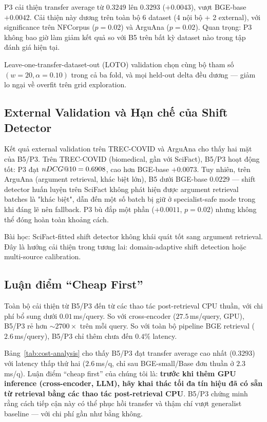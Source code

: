 P3 cải thiện transfer average từ $0.3249$ lên $0.3293$ ($+0.0043$), vượt BGE-base $+0.0042$. Cải thiện
này dương trên toàn bộ 6 dataset (4 nội bộ + 2 external), với significance trên NFCorpus ($p=0.02$) và
ArguAna ($p=0.02$). Quan trọng: P3 không bao giờ làm giảm kết quả so với B5 trên bất kỳ dataset nào
trong tập đánh giá hiện tại.

Leave-one-transfer-dataset-out (LOTO) validation chọn cùng bộ tham số $(w=20, \alpha=0.10)$ trong cả ba
fold, và mọi held-out delta đều dương --- giảm lo ngại về overfit trên grid exploration.

\subsection{External Validation và Hạn chế của Shift Detector}

Kết quả external validation trên TREC-COVID và ArguAna cho thấy hai mặt của B5/P3. Trên TREC-COVID
(biomedical, gần với SciFact), B5/P3 hoạt động tốt: P3 đạt $nDCG@10 = 0.6908$, cao hơn BGE-base $+0.0073$.
Tuy nhiên, trên ArguAna (argument retrieval, khác biệt lớn), B5 dưới BGE-base $0.0229$ --- shift
detector huấn luyện trên SciFact không phát hiện được argument retrieval batches là "khác biệt", dẫn đến
một số batch bị giữ ở specialist-safe mode trong khi đáng lẽ nên fallback. P3 bù đắp một phần ($+0.0011$,
$p=0.02$) nhưng không thể đóng hoàn toàn khoảng cách.

Bài học: SciFact-fitted shift detector không khái quát tốt sang argument retrieval. Đây là hướng cải
thiện trong tương lai: domain-adaptive shift detection hoặc multi-source calibration.

\subsection{Luận điểm ``Cheap First''}

Toàn bộ cải thiện từ B5/P3 đến từ các thao tác post-retrieval CPU thuần, với chi phí bổ sung dưới
$0.01$\,ms/query. So với cross-encoder ($27.5$\,ms/query, GPU), B5/P3 rẻ hơn $\sim 2700\times$ trên mỗi
query. So với toàn bộ pipeline BGE retrieval ($2.6$\,ms/query), B5/P3 chỉ thêm chưa đến $0.4\%$ latency.

Bảng~\ref{tab:cost-analysis} cho thấy B5/P3 đạt transfer average cao nhất ($0.3293$) với latency thấp thứ
hai ($2.6$\,ms/q, chỉ sau BGE-small/Base đơn thuần ở $2.3$\,ms/q). Luận điểm ``cheap first'' của chúng
tôi là: \textbf{trước khi thêm GPU inference (cross-encoder, LLM), hãy khai thác tối đa tín hiệu đã có
sẵn từ retrieval bằng các thao tác post-retrieval CPU}. B5/P3 chứng minh rằng cách tiếp cận này có thể
phục hồi transfer và thậm chí vượt generalist baseline --- với chi phí gần như bằng không.

